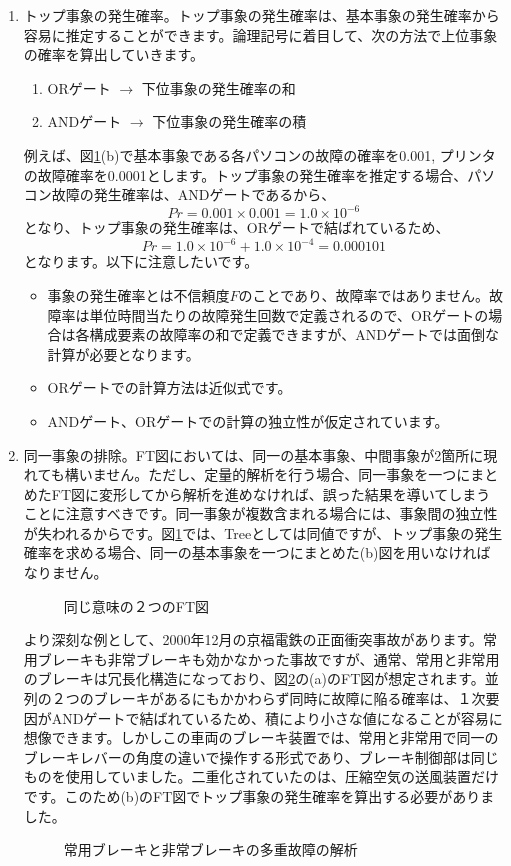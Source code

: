 \begin{enumerate}
\item トップ事象の発生確率。トップ事象の発生確率は、基本事象の発生確率から容易に推定することができます。論理記号に着目して、次の方法で上位事象の確率を算出していきます。
\begin{enumerate}
\item ORゲート $\to$ 下位事象の発生確率の和
\item ANDゲート $\to$ 下位事象の発生確率の積
\end{enumerate}
例えば、図\ref{420}(b)で基本事象である各パソコンの故障の確率を0.001, プリンタの故障確率を0.0001とします。トップ事象の発生確率を推定する場合、パソコン故障の発生確率は、ANDゲートであるから、
\[Pr = 0.001 \times 0.001 = 1.0 \times 10 ^{-6}\]となり、トップ事象の発生確率は、ORゲートで結ばれているため、
\[Pr = 1.0 \times 10 ^{-6} + 1.0 \times 10^{-4} = 0.000101\]
となります。以下に注意したいです。
\begin{itemize}
\item 事象の発生確率とは不信頼度$F$のことであり、故障率ではありません。故障率は単位時間当たりの故障発生回数で定義されるので、ORゲートの場合は各構成要素の故障率の和で定義できますが、ANDゲートでは面倒な計算が必要となります。
\item ORゲートでの計算方法は近似式です。
\item ANDゲート、ORゲートでの計算の独立性が仮定されています。
\end{itemize}
\item 同一事象の排除。FT図においては、同一の基本事象、中間事象が2箇所に現れても構いません。ただし、定量的解析を行う場合、同一事象を一つにまとめたFT図に変形してから解析を進めなければ、誤った結果を導いてしまうことに注意すべきです。同一事象が複数含まれる場合には、事象間の独立性が失われるからです。図\ref{420}では、Treeとしては同値ですが、トップ事象の発生確率を求める場合、同一の基本事象を一つにまとめた(b)図を用いなければなりません。
\begin{figure}[htbp]
\begin{center}
\end{center}
\caption{同じ意味の２つのFT図}
\label{420}
\end{figure}
より深刻な例として、2000年12月の京福電鉄の正面衝突事故があります。常用ブレーキも非常ブレーキも効かなかった事故ですが、通常、常用と非常用のブレーキは冗長化構造になっており、図\ref{421}の(a)のFT図が想定されます。並列の２つのブレーキがあるにもかかわらず同時に故障に陥る確率は、１次要因がANDゲートで結ばれているため、積により小さな値になることが容易に想像できます。しかしこの車両のブレーキ装置では、常用と非常用で同一のブレーキレバーの角度の違いで操作する形式であり、ブレーキ制御部は同じものを使用していました。二重化されていたのは、圧縮空気の送風装置だけです。このため(b)のFT図でトップ事象の発生確率を算出する必要がありました。
\begin{figure}[htbp]
\begin{center}
\end{center}
\caption{常用ブレーキと非常ブレーキの多重故障の解析}
\label{421}
\end{figure}


\end{enumerate}
